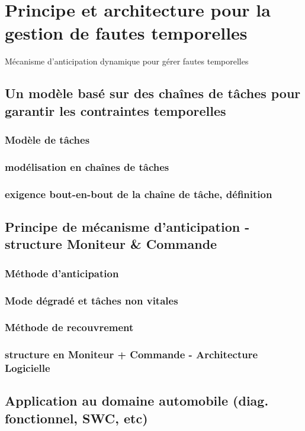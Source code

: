 \documentclass[a4paper,11pt,twoside]{StyleThese}
\begin{document}
\setcounter{chapter}{3} %
\dominitoc
\faketableofcontents
\fi

\chapter{Principe et architecture pour la gestion de fautes temporelles}
\minitoc

Mécanisme d'anticipation dynamique pour gérer fautes temporelles
\section{Un modèle basé sur des chaînes de tâches pour garantir les contraintes temporelles}
    \subsection{Modèle de tâches}
    \subsection{modélisation en chaînes de tâches}
    \subsection{exigence bout-en-bout de la chaîne de tâche, définition}
\section{Principe de mécanisme d'anticipation - structure Moniteur \& Commande}
    \subsection{Méthode d'anticipation}
    \subsection{Mode dégradé et tâches non vitales}
    \subsection{Méthode de recouvrement}
    \subsection{structure en Moniteur + Commande - Architecture Logicielle}
\section{Application au domaine  automobile (diag. fonctionnel, SWC, etc)}

\ifdefined{}
\else


\end{document}
